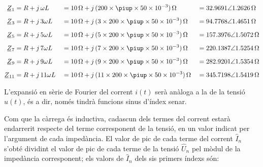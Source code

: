 \begin{exemple}
    \begin{alignat*}{3}
        \cmplx{Z}_1 &= R + j\, \omega L &&= \qty{10}{\ohm} + j\, (200\times \piup\times 50\times 10^{-3})\unit{\,\ohm} &&=
        \complexqty[complex-angle-unit = radians]{32,9691:1,2626}{\ohm}\\[1ex]
        \cmplx{Z}_3 &= R + j\, 3 \omega L &&= \qty{10}{\ohm} + j\, (3\times 200\times \piup\times 50\times 10^{-3})\unit{\,\ohm} &&=
        \complexqty[complex-angle-unit = radians]{94,7768:1,4651}{\ohm}\\[1ex]
        \cmplx{Z}_5 &= R + j\, 5 \omega L &&= \qty{10}{\ohm} + j\, (5\times 200\times \piup\times 50\times 10^{-3})\unit{\,\ohm} &&=
        \complexqty[complex-angle-unit = radians]{157,3976:1,5072}{\ohm}\\[1ex]
        \cmplx{Z}_7 &= R + j\, 7 \omega L &&= \qty{10}{\ohm} + j\, (7\times 200\times \piup\times 50\times 10^{-3})\unit{\,\ohm} &&=
        \complexqty[complex-angle-unit = radians]{220,1387:1,5254}{\ohm}\\[1ex]
        \cmplx{Z}_9 &= R + j\, 9 \omega L &&= \qty{10}{\ohm} + j\, (9\times 200\times \piup\times 50\times 10^{-3})\unit{\,\ohm} &&=
        \complexqty[complex-angle-unit = radians]{282,9201:1,5354}{\ohm}\\[1ex]
        \cmplx{Z}_{11} &= R + j\, 11 \omega L &&= \qty{10}{\ohm} + j\, (11\times 200\times \piup\times 50\times 10^{-3})\unit{\,\ohm} &&=
        \complexqty[complex-angle-unit = radians]{345,7198:1,5419}{\ohm}
    \end{alignat*}

    L'expansió en sèrie de Fourier del corrent $i(t)$ serà anàloga a la
    de la tensió $u(t)$, és a dir, només tindrà funcions sinus
    d'índex senar.

    Com que la càrrega és inductiva, cadascun dels
    termes del corrent estarà endarrerit respecte del terme corresponent
    de la tensió, en un valor indicat per l'argument de cada impedància.
    El valor de pic de cada terme del corrent $\hat{I}_n$ s'obté
    dividint el valor de pic de cada terme de la tensió $\hat{U}_n$ pel
    mòdul de la impedància corresponent; els valors de $\hat{I}_n$ dels sis primers índexs són:
    

\end{exemple}
